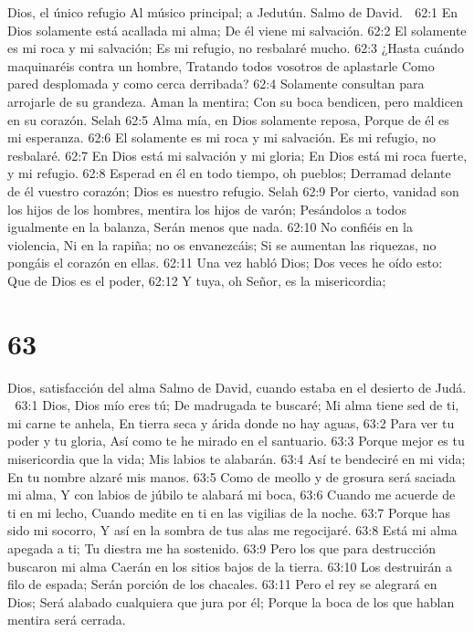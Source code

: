 Dios, el único refugio 
Al músico principal; a Jedutún. Salmo de David. 

62:1 En Dios solamente está acallada mi alma; 
De él viene mi salvación. 
62:2 El solamente es mi roca y mi salvación; 
Es mi refugio, no resbalaré mucho. 
62:3 ¿Hasta cuándo maquinaréis contra un hombre, 
Tratando todos vosotros de aplastarle 
Como pared desplomada y como cerca derribada? 
62:4 Solamente consultan para arrojarle de su grandeza. 
Aman la mentira; 
Con su boca bendicen, pero maldicen en su corazón. Selah 
62:5 Alma mía, en Dios solamente reposa, 
Porque de él es mi esperanza. 
62:6 El solamente es mi roca y mi salvación. 
Es mi refugio, no resbalaré. 
62:7 En Dios está mi salvación y mi gloria; 
En Dios está mi roca fuerte, y mi refugio. 
62:8 Esperad en él en todo tiempo, oh pueblos; 
Derramad delante de él vuestro corazón; 
Dios es nuestro refugio. Selah 
62:9 Por cierto, vanidad son los hijos de los hombres, mentira los hijos de varón; 
Pesándolos a todos igualmente en la balanza, 
Serán menos que nada. 
62:10 No confiéis en la violencia, 
Ni en la rapiña; no os envanezcáis; 
Si se aumentan las riquezas, no pongáis el corazón en ellas. 
62:11 Una vez habló Dios; 
Dos veces he oído esto: 
Que de Dios es el poder, 
62:12 Y tuya, oh Señor, es la misericordia;  
  

\chapter{63}

Dios, satisfacción del alma 
Salmo de David, cuando estaba en el desierto de Judá. 

63:1 Dios, Dios mío eres tú; 
De madrugada te buscaré; 
Mi alma tiene sed de ti, mi carne te anhela, 
En tierra seca y árida donde no hay aguas, 
63:2 Para ver tu poder y tu gloria, 
Así como te he mirado en el santuario. 
63:3 Porque mejor es tu misericordia que la vida; 
Mis labios te alabarán. 
63:4 Así te bendeciré en mi vida; 
En tu nombre alzaré mis manos. 
63:5 Como de meollo y de grosura será saciada mi alma, 
Y con labios de júbilo te alabará mi boca, 
63:6 Cuando me acuerde de ti en mi lecho, 
Cuando medite en ti en las vigilias de la noche. 
63:7 Porque has sido mi socorro, 
Y así en la sombra de tus alas me regocijaré. 
63:8 Está mi alma apegada a ti; 
Tu diestra me ha sostenido. 
63:9 Pero los que para destrucción buscaron mi alma 
Caerán en los sitios bajos de la tierra. 
63:10 Los destruirán a filo de espada; 
Serán porción de los chacales. 
63:11 Pero el rey se alegrará en Dios; 
Será alabado cualquiera que jura por él; 
Porque la boca de los que hablan mentira será cerrada. 

